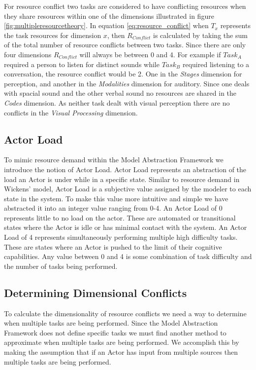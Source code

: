 For resource conflict two tasks are considered to have conflicting resources when they share resources within one of the dimensions illustrated in figure \ref{fig:multipleresourcetheory}.  In equation \ref{eq:resource_conflict} when $T_{x}$ represents the task resources for dimension $x$, then $R_{Conflict}$ is calculated by taking the sum of the total number of resource conflicts between two tasks.  Since there are only four dimensions $R_{Conflict}$ will always be between 0 and 4.  For example if $Task_{A}$ required a person to listen for distinct sounds while $Task_{B}$ required listening to a conversation, the resource conflict would be 2.  One in the {\em Stages} dimension for perception, and another in the {\em Modalities} dimension for auditory.  Since one deals with spacial sound and the other verbal sound no resources are shared in the {\em Codes} dimension.  As neither task dealt with visual perception there are no conflicts in the {\em Visual Processing} dimension.


  
\subsection{Actor Load}
To mimic resource demand within the Model Abstraction Framework we introduce the notion of Actor Load.  Actor Load represents an abstraction of the load an Actor is under while in a specific state.  Similar to resource demand in Wickens' model, Actor Load is a subjective value assigned by the modeler to each state in the system.  To make this value more intuitive and simple we have abstracted it into an integer value ranging from 0-4.  An Actor Load of 0 represents little to no load on the actor.  These are automated or transitional states where the Actor is idle or has minimal contact with the system.  An Actor Load of 4 represents simultaneously performing multiple high difficulty tasks.  These are states where an Actor is pushed to the limit of their cognitive capabilities. Any value between 0 and 4 is some combination of task difficulty and the number of tasks being performed.

\subsection{Determining Dimensional Conflicts}
To calculate the dimensionality of resource conflicts we need a way to determine when multiple tasks are being performed.  Since the Model Abstraction Framework does not define specific tasks we must find another method to approximate when multiple tasks are being performed.  We accomplish this by making the assumption that if an Actor has input from multiple sources then multiple tasks are being performed.

